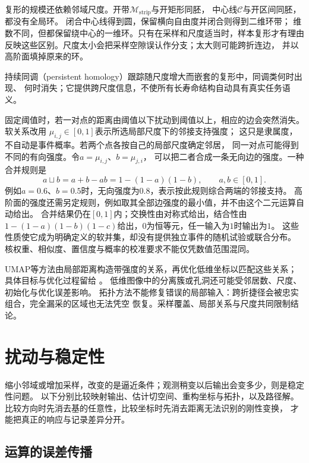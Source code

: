 复形的规模还依赖邻域尺度。开带$\mathcal M_{\mathrm{strip}}$与开矩形同胚，
中心线$\mathcal C$与开区间同胚，都没有全局环。
闭合中心线得到圆，保留横向自由度并闭合则得到二维环带；
维数不同，但都保留绕中心的一维环。只有在采样和尺度适当时，样本复形才有理由
反映这些区别。尺度太小会把采样空隙误认作分支；太大则可能跨折连边，
并以高阶面填掉原来的环。

持续同调（persistent homology）跟踪随尺度增大而嵌套的复形中，同调类何时出现、
何时消失；它提供跨尺度信息，不使所有长寿命结构自动具有真实任务语义。


固定阈值时，若一对点的距离由阈值以下扰动到阈值以上，相应的边会突然消失。软关系改用
$\mu_{i,j}\in[0,1]$表示所选局部尺度下的邻接支持强度；
这只是隶属度，不自动是事件概率。若两个点各按自己的局部尺度确定邻居，
同一对点可能得到不同的有向强度。令$a=\mu_{i,j}$、$b=\mu_{j,i}$，
可以把二者合成一条无向边的强度。一种合并规则是
\begin{equation}
 a\mathbin{\sqcup}b=a+b-ab=1-(1-a)(1-b),\qquad a,b\in[0,1].
 \label{eq:geometry-fuzzy-union}
\end{equation}
例如$a=0.6$、$b=0.5$时，无向强度为$0.8$，表示按此规则综合两端的邻接支持。
高阶面的强度还需另定规则，例如取其全部边强度的最小值，并不由这个二元运算自动给出。
合并结果仍在$[0,1]$内；交换性由对称式给出，结合性由
$1-(1-a)(1-b)(1-c)$给出，$0$为恒等元，任一输入为$1$时输出为$1$。
这些性质使它成为明确定义的软并集，却没有提供独立事件的随机试验或联合分布。
核权重、相似度、置信度与概率的校准要求不能仅凭数值范围混同。

UMAP等方法由局部距离构造带强度的关系，再优化低维坐标以匹配这些关系；
具体目标与优化过程留给
。
低维图像中的分离簇或孔洞还可能受邻居数、尺度、初始化与优化误差影响。
拓扑方法不能修复错误的局部输入：跨折捷径会被忠实组合，完全漏采的区域也无法凭空
恢复。采样覆盖、局部关系与尺度共同限制结论。

\section{扰动与稳定性}
\label{sec:geometry-stability}

缩小邻域或增加采样，改变的是逼近条件；观测稍变以后输出会变多少，则是稳定性问题。
以下分别比较映射输出、估计切空间、重构坐标与拓扑，以及路径解。
比较方向时先消去基的任意性，比较坐标时先消去距离无法识别的刚性变换，
才能把真正的响应与记录差异分开。

\subsection{运算的误差传播}
\label{sec:geometry-operation-stability}


